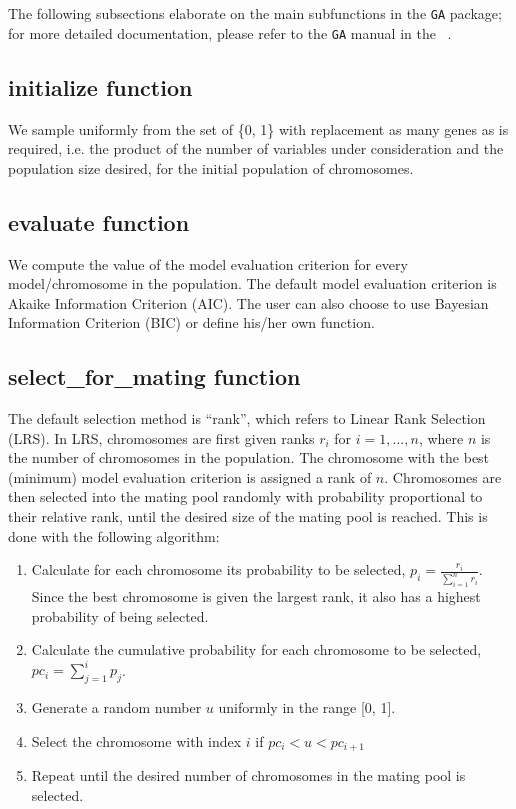 \documentclass[11pt]{article}
\begin{document}
The following subsections elaborate on the main subfunctions in the \texttt{GA} package; for more detailed documentation, please refer to the \texttt{GA} manual in the ~.

\subsection*{initialize function}
We sample uniformly from the set of \{0, 1\} with replacement as many genes as is required, i.e. the product of the number of variables under consideration and the population size desired, for the initial population of chromosomes.

\subsection*{evaluate function}
We compute the value of the model evaluation criterion for every model/chromosome in the population. The default model evaluation criterion is Akaike Information Criterion (AIC). The user can also choose to use Bayesian Information Criterion (BIC) or define his/her own function.

\subsection*{select\_for\_mating function}
The default selection method is ``rank'', which refers to Linear Rank Selection (LRS). In LRS, chromosomes are first given ranks $r_i$ for $i = 1, ..., n$, where $n$ is the number of chromosomes in the population. The chromosome with the best (minimum) model evaluation criterion is assigned a rank of $n$. Chromosomes are then selected into the mating pool randomly with probability proportional to their relative rank, until the desired size of the mating pool is reached. This is done with the following algorithm:
\begin{enumerate}
\item Calculate for each chromosome its probability to be selected, $p_i = \frac{r_i}{\sum\limits_{i=1}^n{r_i}}$. Since the best chromosome is given the largest rank, it also has a highest probability of being selected.
\item Calculate the cumulative probability for each chromosome to be selected, $pc_i = \sum\limits_{j=1}^i{p_j}$.
\item Generate a random number $u$ uniformly in the range [0, 1].
\item Select the chromosome with index $i$ if $pc_i < u < pc_{i+1}$
\item Repeat until the desired number of chromosomes in the mating pool is selected.
\end{enumerate}
\end{document}
